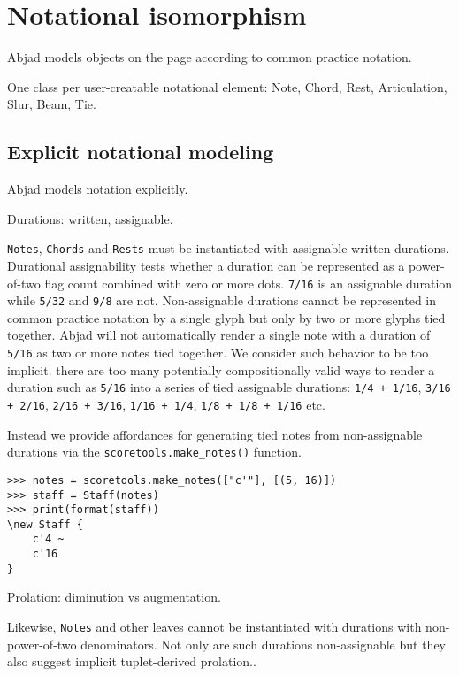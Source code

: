 \section{Notational isomorphism}\label{sec:notational_isomorphism}

Abjad models objects on the page according to common practice notation.

One class per user-creatable notational element: Note, Chord, Rest,
Articulation, Slur, Beam, Tie.

\subsection{Explicit notational modeling}

Abjad models notation explicitly.

Durations: written, assignable.

\texttt{Notes}, \texttt{Chords} and \texttt{Rests} must be instantiated with
assignable written durations. Durational assignability tests whether a duration
can be represented as a power-of-two flag count combined with zero or more
dots. \texttt{7/16} is an assignable duration while \texttt{5/32} and
\texttt{9/8} are not. Non-assignable durations cannot be represented in common
practice notation by a single glyph but only by two or more glyphs tied
together. Abjad will not automatically render a single note with a duration of
\texttt{5/16} as two or more notes tied together. We consider such behavior to
be too implicit. there are too many potentially compositionally valid ways to
render a duration such as \texttt{5/16} into a series of tied assignable
durations: \texttt{1/4 + 1/16}, \texttt{3/16 + 2/16}, \texttt{2/16 + 3/16},
\texttt{1/16 + 1/4}, \texttt{1/8 + 1/8 + 1/16} etc.

Instead we provide affordances for generating tied notes from
non-assignable durations via the \texttt{scoretools.make\_notes()} function.

\begin{lstlisting}
>>> notes = scoretools.make_notes(["c'"], [(5, 16)])
>>> staff = Staff(notes)
>>> print(format(staff))
\new Staff {
    c'4 ~
    c'16
}
\end{lstlisting}

Prolation: diminution vs augmentation.

Likewise, \texttt{Notes} and other leaves cannot be instantiated with durations
with non-power-of-two denominators. Not only are such durations non-assignable
but they also suggest implicit tuplet-derived prolation..

